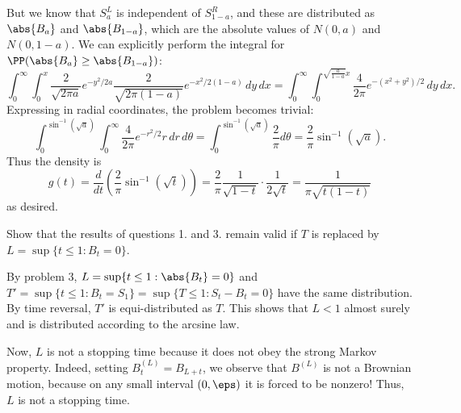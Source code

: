 \documentclass{scrartcl}
\begin{document}
But we know that $S^L_a$ is independent of $S^R_{1-a}$, and these are distributed as $\abs{B_a}$ and $\abs{B_{1-a}}$, which are the absolute values of $N(0,a)$ and $N(0,1-a)$. We can explicitly perform the integral for $\PP(\abs{B_a} \geq \abs{B_{1-a}})$:
\[
    \int_0^\infty \int_0^x \frac{2}{\sqrt{2\pi a}}e^{-y^2/2a}\frac{2}{\sqrt{2\pi (1-a)}}e^{-x^2/2(1-a)}\,dy\,dx = \int_0^\infty \int_0^{\sqrt{\frac{a}{1-a}} x} \frac{4}{2\pi}e^{-(x^2 + y^2)/2}\,dy\,dx.
\]
Expressing in radial coordinates, the problem becomes trivial:
\[
    \int_0^{\sin^{-1}(\sqrt{a})} \int_0^\infty \frac{4}{2\pi}e^{-r^2/2} r\,dr\,d\theta = \int_0^{\sin^{-1}(\sqrt{a})} \frac{2}{\pi} d\theta = \frac{2}{\pi}\sin^{-1}(\sqrt{a}).
\]
Thus the density is
\[
    g(t) = \frac{d}{dt}\left(\frac{2}{\pi}\sin^{-1}(\sqrt{t})\right) = \frac{2}{\pi} \frac{1}{\sqrt{1 - t}} \cdot \frac{1}{2\sqrt{t}} = \frac{1}{\pi\sqrt{t(1-t)}}
\]
as desired.
\begin{prob}
    Show that the results of questions 1. and 3. remain valid if $T$ is replaced by $L = \sup\{t \leq 1: B_t = 0\}$.
\end{prob}

By problem 3, $L = \sup\{t\leq 1: \abs{B_t} = 0\}$ and $T' = \sup\{t\leq 1: B_t = S_1\} = \sup\{T\leq 1: S_t - B_t = 0\}$ have the same distribution. By time reversal, $T'$ is equi-distributed as $T$. This shows that $L < 1$ almost surely and is distributed according to the arcsine law.


Now, $L$ is not a stopping time because it does not obey the strong Markov property. Indeed, setting $B^{(L)}_t = B_{L + t}$, we observe that $B^{(L)}$ is not a Brownian motion, because on any small interval $(0,\eps)$ it is forced to be nonzero! Thus, $L$ is not a stopping time.

\end{document}
